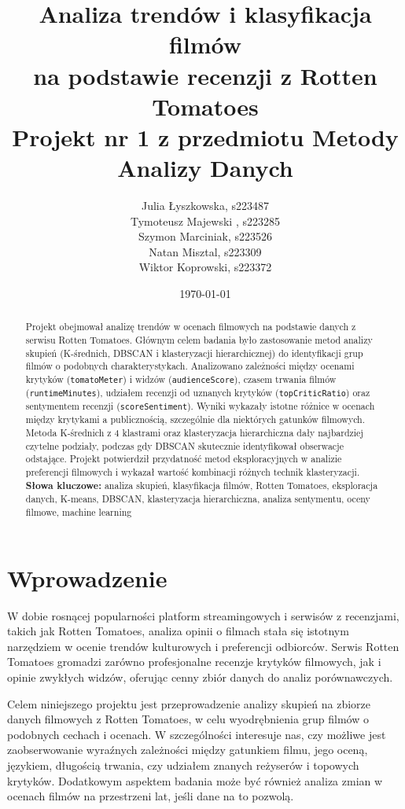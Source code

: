 \documentclass[a4paper,12pt,titlepage]{article}
\title{Analiza trendów i klasyfikacja filmów\\na podstawie recenzji z Rotten Tomatoes\\\large Projekt nr 1 z przedmiotu Metody Analizy Danych}
\author{Julia Łyszkowska, s223487\\Tymoteusz Majewski , s223285\\Szymon Marciniak, s223526\\Natan Misztal, s223309\\Wiktor Koprowski, s223372}
\date{\today}
\begin{document}
\begin{titlepage}
  \maketitle
\end{titlepage}
\clearpage

\begin{abstract}
Projekt obejmował analizę trendów w ocenach filmowych na podstawie danych z serwisu Rotten Tomatoes. Głównym celem badania było zastosowanie metod analizy skupień (K-średnich, DBSCAN i klasteryzacji hierarchicznej) do identyfikacji grup filmów o podobnych charakterystykach. Analizowano zależności między ocenami krytyków (\texttt{tomatoMeter}) i widzów (\texttt{audienceScore}), czasem trwania filmów (\texttt{runtimeMinutes}), udziałem recenzji od uznanych krytyków (\texttt{topCriticRatio}) oraz sentymentem recenzji (\texttt{scoreSentiment}). Wyniki wykazały istotne różnice w ocenach między krytykami a publicznością, szczególnie dla niektórych gatunków filmowych. Metoda K-średnich z 4 klastrami oraz klasteryzacja hierarchiczna dały najbardziej czytelne podziały, podczas gdy DBSCAN skutecznie identyfikował obserwacje odstające. Projekt potwierdził przydatność metod eksploracyjnych w analizie preferencji filmowych i wykazał wartość kombinacji różnych technik klasteryzacji.\\

\noindent\textbf{Słowa kluczowe:} analiza skupień, klasyfikacja filmów, Rotten Tomatoes, eksploracja danych, K-means, DBSCAN, klasteryzacja hierarchiczna, analiza sentymentu, oceny filmowe, machine learning
\end{abstract}

\clearpage
\tableofcontents
\clearpage

\section{Wprowadzenie}

W dobie rosnącej popularności platform streamingowych i serwisów z recenzjami, takich jak Rotten Tomatoes, analiza opinii o filmach stała się istotnym narzędziem w ocenie trendów kulturowych i preferencji odbiorców. Serwis Rotten Tomatoes gromadzi zarówno profesjonalne recenzje krytyków filmowych, jak i opinie zwykłych widzów, oferując cenny zbiór danych do analiz porównawczych. 

Celem niniejszego projektu jest przeprowadzenie analizy skupień na zbiorze danych filmowych z Rotten Tomatoes, w celu wyodrębnienia grup filmów o podobnych cechach i ocenach. W szczególności interesuje nas, czy możliwe jest zaobserwowanie wyraźnych zależności między gatunkiem filmu, jego oceną, językiem, długością trwania, czy udziałem znanych reżyserów i topowych krytyków. Dodatkowym aspektem badania może być również analiza zmian w ocenach filmów na przestrzeni lat, jeśli dane na to pozwolą.
\end{document}
